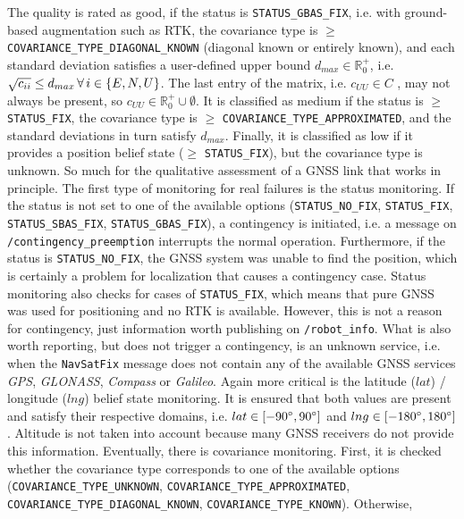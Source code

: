 \documentclass[english, master, utf8]{base/thesis_KBS}
\newcommand{\code}[1]{\colorbox{light-gray}{\texttt{#1}}}
\begin{document}
The quality is rated as good, if the status is \code{STATUS\_GBAS\_FIX}, i.e. with ground-based augmentation such as RTK, the covariance type is $\geq$ 
\code{COVARIANCE\_TYPE\_DIAGONAL\_KNOWN} (diagonal known or entirely known), and each standard deviation satisfies a user-defined upper bound $d_{max} \in \mathbb{R}_{0}^{+}$,
i.e. $\sqrt{c_{ii}} \leq d_{max} \thinspace \forall \thinspace i \in \{E, N, U\}$. The last entry of the matrix, i.e. $c_{UU} \in C$ , may not always be present, so
$c_{UU} \in \mathbb{R}_{0}^{+} \cup \emptyset$. It is classified as medium if the status is $\geq$ \code{STATUS\_FIX}, the covariance type is $\geq$
\code{COVARIANCE\_TYPE\_APPROXIMATED}, and the standard deviations in turn satisfy $d_{max}$. 
Finally, it is classified as low if it provides a position belief state ($\geq$ \code{STATUS\_FIX}), but the covariance
type is unknown. So much for the qualitative assessment of a GNSS link that works in principle.\newline
The first type of monitoring for real failures is the status monitoring. If the status is not set to one of the available options (\code{STATUS\_NO\_FIX}, \code{STATUS\_FIX},
\code{STATUS\_SBAS\_FIX}, \code{STATUS\_GBAS\_FIX}), a contingency is initiated, i.e. a message on \code{/contingency\_preemption} interrupts the normal operation.
Furthermore, if the status is \code{STATUS\_NO\_FIX}, the GNSS system was unable to find the position, which is certainly a problem for localization that causes a contingency
case. Status monitoring also checks for cases of \code{STATUS\_FIX}, which means that pure GNSS was used for positioning and no RTK is available. However, this is not a reason for
contingency, just information worth publishing on \code{/robot\_info}. What is also worth reporting, but does not trigger a contingency, is an unknown service, i.e. when the
\code{NavSatFix} message does not contain any of the available GNSS services \textit{GPS}, \textit{GLONASS}, \textit{Compass} or \textit{Galileo}. Again more critical is the latitude ($lat$) / longitude ($lng$) belief state
monitoring. It is ensured that both values are present and satisfy their respective domains, i.e. $lat \in [-90\degree, 90\degree]$ and $lng \in [-180\degree, 180\degree]$. Altitude is not taken into account
because many GNSS receivers do not provide this information. Eventually, there is covariance monitoring. First, it is checked whether the covariance type corresponds to one of the
available options (\code{COVARIANCE\_TYPE\_UNKNOWN}, \code{COVARIANCE\_TYPE\_APPROXIMATED}, \code{COVARIANCE\_TYPE\_DIAGONAL\_KNOWN}, \code{COVARIANCE\_TYPE\_KNOWN}). Otherwise,
\end{document}
